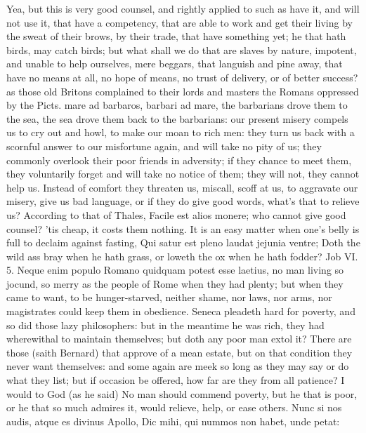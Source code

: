 {Yea, but this is very good counsel, and rightly applied to such as have
it, and will not use it, that have a competency, that are able to work
and get their living by the sweat of their brows, by their trade, that
have something yet; he that hath birds, may catch birds; but what shall
we do that are slaves by nature, impotent, and unable to help
ourselves, mere beggars, that languish and pine away, that have no
means at all, no hope of means, no trust of delivery, or of better
success? as those old Britons complained to their lords and masters the
Romans oppressed by the Picts. mare ad barbaros, barbari ad mare, the
barbarians drove them to the sea, the sea drove them back to the
barbarians: our present misery compels us to cry out and howl, to make
our moan to rich men: they turn us back with a scornful answer to our
misfortune again, and will take no pity of us; they commonly overlook
their poor friends in adversity; if they chance to meet them, they
voluntarily forget and will take no notice of them; they will not, they
cannot help us. Instead of comfort they threaten us, miscall, scoff at
us, to aggravate our misery, give us bad language, or if they do give
good words, what's that to relieve us? According to that of Thales,
Facile est alios monere; who cannot give good counsel? 'tis cheap, it
costs them nothing. It is an easy matter when one's belly is full to
declaim against fasting, Qui satur est pleno laudat jejunia ventre;
Doth the wild ass bray when he hath grass, or loweth the ox when he
hath fodder? Job VI. 5. Neque enim populo Romano quidquam potest
esse laetius, no man living so jocund, so merry as the people of Rome
when they had plenty; but when they came to want, to be hunger-starved,
neither shame, nor laws, nor arms, nor magistrates could keep them in
obedience. Seneca pleadeth hard for poverty, and so did those lazy
philosophers: but in the meantime he was rich, they had
wherewithal to maintain themselves; but doth any poor man extol it?
There are those (saith  Bernard) that approve of a mean estate,
but on that condition they never want themselves: and some again are
meek so long as they may say or do what they list; but if occasion be
offered, how far are they from all patience? I would to God (as he
said) No man should commend poverty, but he that is poor, or he
that so much admires it, would relieve, help, or ease others.
Nunc si nos audis, atque es divinus Apollo,
Dic mihi, qui nummos non habet, unde petat:

}
